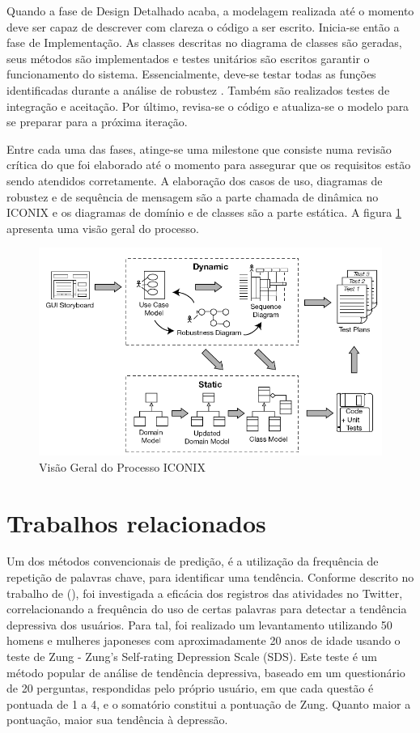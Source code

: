 \documentclass[
	12pt,				%
	openright,			%
	oneside,			%
	a4paper,			%
	english,			%
	spanish,			%
	brazil				%
	]{abntex2}
\begin{document}
	Quando a fase de Design Detalhado acaba, a modelagem realizada até o momento deve ser capaz de descrever com clareza o código a ser escrito. Inicia-se então a fase de Implementação. As classes descritas no diagrama de classes são geradas, seus métodos são implementados e testes unitários são escritos garantir o funcionamento do sistema. Essencialmente, deve-se testar todas as funções identificadas durante a análise de robustez \cite{iconix}. Também são realizados testes de integração e aceitação. Por último, revisa-se o código e atualiza-se o modelo para se preparar para a próxima iteração.  
	
	Entre cada uma das fases, atinge-se uma milestone que consiste numa revisão crítica do que foi elaborado até o momento para assegurar que os requisitos estão sendo atendidos corretamente. A elaboração dos casos de uso, diagramas de robustez e de sequência de mensagem são a parte chamada de dinâmica no ICONIX e os diagramas de domínio e de classes são a parte estática. A figura \ref{iconix_diagram} apresenta uma visão geral do processo.
	
\begin{figure}[!htb]
\centering
\includegraphics[scale=0.5]{iconix}
\caption{Visão Geral do Processo ICONIX \cite{iconix}}
\label{iconix_diagram}
\end{figure}

\section{Trabalhos relacionados}

	Um dos métodos convencionais de predição, é a utilização da frequência de repetição de palavras chave, para identificar uma tendência. Conforme descrito no trabalho de  (\citeyear{article_Tsugawa2013}), foi investigada a eficácia dos registros das atividades no Twitter, correlacionando a frequência do uso de certas palavras para detectar a tendência depressiva dos usuários. Para tal, foi realizado um levantamento utilizando 50 homens e mulheres japoneses com aproximadamente 20 anos de idade usando o teste de Zung - Zung’s Self-rating Depression Scale (SDS). Este teste é um método popular de análise de tendência depressiva, baseado em um questionário de 20 perguntas, respondidas pelo próprio usuário, em que cada questão é pontuada de 1 a 4, e o somatório constitui a pontuação de Zung. Quanto maior a pontuação, maior sua tendência à depressão. 
	
\end{document}
